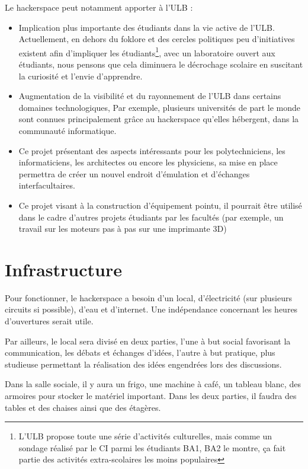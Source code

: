 \documentclass{article}
\begin{document}
Le hackerspace peut notamment apporter à l'ULB : 
\begin{itemize}
\item Implication plus importante des étudiants dans la vie active de l'ULB.
Actuellement, en dehors du foklore et des cercles politiques peu d'initiatives existent afin d'impliquer les étudiants\footnote{L'ULB
propose toute une série d'activités culturelles, mais comme un sondage réalisé par le CI parmi les étudiants BA1, BA2
le montre, ça fait partie des activités extra-scolaires les moins populaires},
avec un laboratoire ouvert aux étudiants, nous pensons que cela diminuera le décrochage
scolaire en suscitant la curiosité et l'envie d'apprendre.
\item Augmentation de la visibilité et du rayonnement de l'ULB dans certains domaines technologiques,
Par exemple, plusieurs universités de part le monde sont connues
principalement grâce au hackerspace qu'elles hébergent, dans la communauté informatique.
\item Ce projet présentant des aspects intéressants pour les polytechniciens, les informaticiens,
les architectes ou encore les physiciens, sa mise en place permettra de créer un nouvel endroit d'émulation
et d'échanges interfacultaires.
\item Ce projet visant à la construction d'équipement pointu, il pourrait être utilisé dans le cadre d'autres projets étudiants par les facultés (par exemple, un travail sur les moteurs pas à pas sur une imprimante 3D)
\end{itemize}

\section{Infrastructure}

Pour fonctionner, le hackerspace a besoin d'un local, d'électricité 
(sur plusieurs circuits si possible), d'eau et d'internet. Une indépendance concernant les heures d'ouvertures serait utile.

Par ailleurs, le local sera divisé en deux parties, l'une à but social favorisant la communication, les débats et échanges d'idées, l'autre à but pratique, plus studieuse permettant la réalisation des idées engendrées lors des discussions. 

Dans la salle sociale, il y aura un frigo, une machine à café, un tableau blanc, 
des armoires pour stocker le matériel important. Dans les deux parties, il faudra des tables et des chaises ainsi que des étagères.
\end{document}
